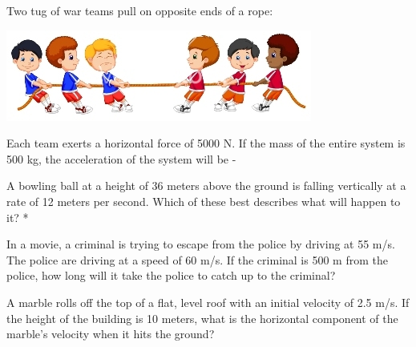 \documentclass[10pt]{examdesign}
\begin{document}
\begin{multiplechoice} [title={Multiple Choice},
	rearrange=no]
\begin{question}
	Two tug of war teams pull on opposite ends of a rope:
	
	\begin{center}
			\includegraphics[height={.5in}]{tug.png}
	\end{center}

	
	 Each team exerts a horizontal force of 5000 N.  If the mass of the entire system is 500 kg, the acceleration of the system will be - 
\end{question}




\begin{question}
A bowling ball at a height of 36 meters above the ground is falling vertically at a rate of 12 meters per second. Which of these best describes what will happen to it? *
\end{question}

\begin{question}
	In a movie, a criminal is trying to escape from the police by driving at 55 m/s. The police are driving at a speed of 60 m/s.  If the criminal is 500 m from the police, how long will it take the police to catch up to the criminal?  
\end{question}



\begin{question}
	A marble rolls off the top of a flat, level roof with an initial velocity of 2.5 m/s.  If the height of the building is 10 meters, what is the horizontal component of the marble's velocity when it hits the ground?
\end{question}





\end{multiplechoice}
\end{document}
